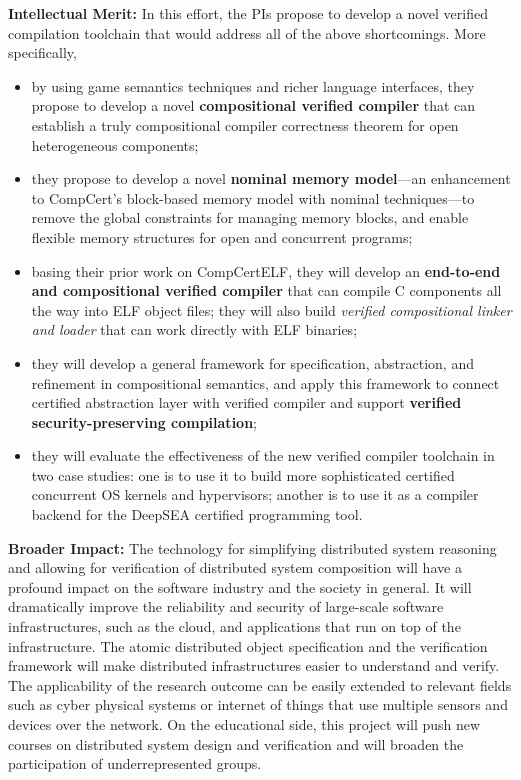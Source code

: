 {\bf Intellectual Merit:} In this effort, the PIs propose to
develop a novel verified compilation toolchain that would address
all of the above shortcomings. More specifically,
\begin{itemize}
\item by using game semantics techniques and richer language interfaces,
they propose to develop a novel {\bf compositional verified compiler} that
can establish a truly compositional compiler correctness theorem for
open heterogeneous components;
\item they propose to develop a novel {\bf nominal memory model}---an
enhancement to CompCert's block-based memory model with nominal
techniques---to remove the global constraints for managing memory
blocks, and enable flexible memory structures for open and concurrent
programs;
\item basing their prior work on CompCertELF, they will develop an
{\bf end-to-end and compositional verified
compiler} that can compile C components all the way into ELF
object files; they will also build {\em verified compositional linker
and loader} that can work directly with ELF binaries;
\item they will develop a general
framework for specification, abstraction, and refinement in
compositional semantics, and apply this framework to connect
certified abstraction layer with verified compiler and support
{\bf verified security-preserving compilation};
\item they will evaluate the effectiveness of the new verified compiler
toolchain in two case studies: one is to use it to build more sophisticated
certified concurrent OS kernels and hypervisors; another is to
use it as a compiler backend for the DeepSEA certified programming tool.
\end{itemize}

{\bf Broader Impact:} The technology for simplifying distributed
system reasoning and allowing for verification of distributed system
composition will have a profound impact on the software industry and
the society in general. It will dramatically improve the reliability
and security of large-scale software infrastructures, such as the
cloud, and applications that run on top of the infrastructure.  The
atomic distributed object specification and the verification framework
will make distributed infrastructures easier to understand and verify.
The applicability of the research outcome can be easily extended to
relevant fields such as cyber physical systems or internet of things
that use multiple sensors and devices over the network.  On the
educational side, this project will push new courses on distributed
system design and verification and will broaden the participation of
underrepresented groups.

